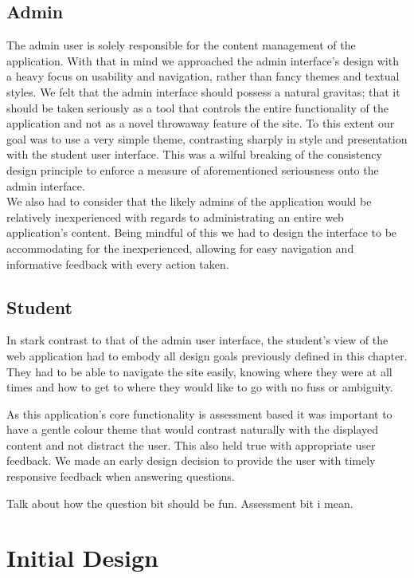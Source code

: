 \documentclass{l3proj}
\begin{document}
\subsection{Admin}

The admin user is solely responsible for the content management of the application. With that in mind we approached the admin interface's design with a heavy focus on usability and navigation, rather than fancy themes and textual styles. We felt that the admin interface should possess a natural gravitas; that it should be taken seriously as a tool that controls the entire functionality of the application and not as a novel throwaway feature of the site. To this extent our goal was to use a very simple theme, contrasting sharply in style and presentation with the student user interface. This was a wilful breaking of the consistency design principle to enforce a measure of aforementioned seriousness onto the admin interface. \\

We also had to consider that the likely admins of the application would be relatively inexperienced with regards to administrating an entire web application's content. Being mindful of this we had to design the interface to be accommodating for the inexperienced, allowing for easy navigation and informative feedback with every action taken.

\subsection{Student}

In stark contrast to that of the admin user interface, the student's view of the web application had to embody all design goals previously defined in this chapter. They had to be able to navigate the site easily, knowing where they were at all times and how to get to where they would like to go with no fuss or ambiguity.

As this application's core functionality is assessment based it was important to have a gentle colour theme that would contrast naturally with the displayed content and not distract the user. This also held true with appropriate user feedback. We made an early design decision to provide the user with timely responsive feedback when answering questions.

Talk about how the question bit should be fun. Assessment bit i mean.

\section{Initial Design}
\end{document}
